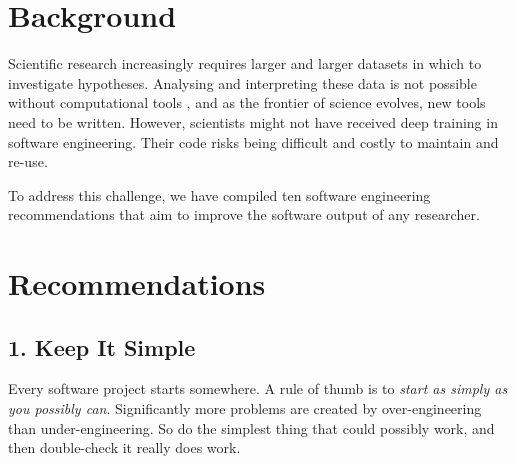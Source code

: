 \documentclass{bmcart}
\begin{document}


\section*{Background}

Scientific research increasingly requires larger and larger datasets in which to investigate hypotheses. Analysing and interpreting these data is not possible without computational tools \cite{goble2014}, and as the frontier of science evolves, new tools need to be written. However, scientists might not have received deep training in software engineering. Their code risks being difficult and costly to maintain and re-use. 

To address this challenge, we have compiled ten software engineering recommendations that aim to improve the software output of any researcher. 

\section*{Recommendations}

\subsection*{1. Keep It Simple}

Every software project starts somewhere. A rule of thumb is to \textit{start as simply as you possibly can}. Significantly more problems are created by over-engineering than under-engineering. So do the simplest thing that could possibly work, and then double-check it really does work. 
\end{document}
